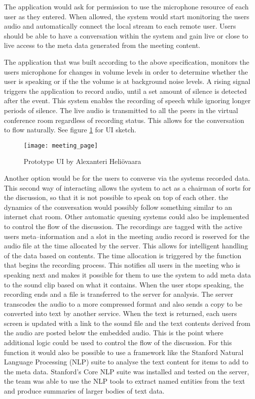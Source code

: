 \documentclass[english,12pt,a4paper,pdftex]{article}
\begin{document}
The application would ask for permission to use the microphone resource of each user as they entered. When allowed, the system would start monitoring the users audio and automatically connect the local stream to each remote user. Users should be able to have a conversation within the system and gain live or close to live access to the meta data generated from the meeting content.

The application that was built according to the above specification, monitors the users microphone for changes in volume levels in order to determine whether the user is speaking or if the the volume is at background noise levels. A rising signal triggers the application to record audio, until a set amount of silence is detected after the event. This system enables the recording of speech while ignoring longer periods of silence. The live audio is transmitted to all the peers in the virtual conference room regardless of recording status. This allows for the conversation to flow naturally. See figure \ref{fig:meeting_page} for UI sketch.

\begin{figure}[H]

\centering \texttt{[image: meeting\_page]}
\caption{Prototype UI by Alexanteri Heliövaara}
\label{fig:meeting_page}

\end{figure}


Another option would be for the users to converse via the systems recorded data. This second way of interacting allows the system to act as a chairman of sorts for the discussion, so that it is not possible to speak on top of each other. the dynamics of the conversation would possibly follow something similar to an internet chat room. Other automatic queuing systems could also be implemented to control the flow of the discussion. The recordings are tagged with the active users meta--information and a slot in the meeting audio record is reserved for the audio file at the time allocated by the server. This allows for intelligent handling of the data based on contents. The time allocation is triggered by the function that begins the recording process. This notifies all users in the meeting who is speaking next and makes it possible for them to use the system to add meta data to the sound clip based on what it contains. When the user stops speaking, the recording ends and a file is transferred to the server for analysis. The server transcodes the audio to a more compressed format and also sends a copy to be converted into text by another service. When the text is returned, each users screen is updated with a link to the sound file and the text contents derived from the audio are posted below the embedded audio. This is the point where additional logic could be used to control the flow of the discussion. For this function it would also be possible to use a framework like the Stanford Natural Language Processing (NLP) suite to analyse the text content for items to add to the meta data. Stanford's Core NLP suite was installed and tested on the server, the team was able to use the NLP tools to extract named entities from the text and produce summaries of larger bodies of text data.
\end{document}
